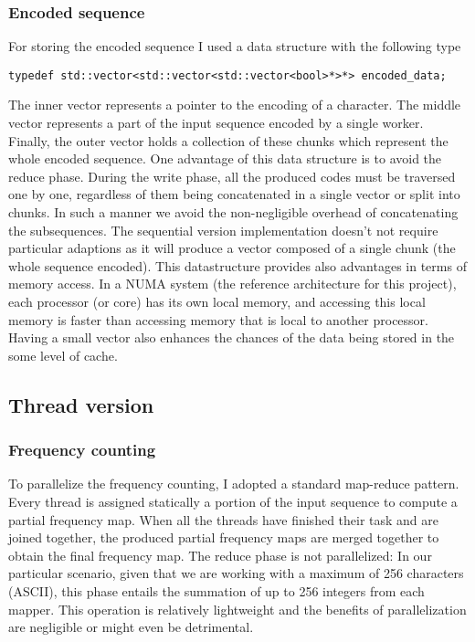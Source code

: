 \documentclass{article}
\begin{document}
\subsubsection{Encoded sequence}
For storing the encoded sequence I used a data structure with the following type

\begin{verbatim}
typedef std::vector<std::vector<std::vector<bool>*>*> encoded_data;
\end{verbatim}

The inner vector represents a
pointer to the encoding of a character. The middle vector
represents a part of the input sequence encoded by a single worker.
Finally, the outer vector holds a collection of these chunks which represent
the whole encoded sequence.
One advantage of this data structure is to avoid the reduce phase.
During the write phase, all the produced codes must be traversed one by one, regardless
of them being concatenated in a single vector or split into chunks. In such a manner we
avoid the non-negligible overhead of concatenating the subsequences.
The sequential version implementation doesn't not require particular adaptions as it
will produce a vector composed of a single chunk (the whole sequence encoded).
This datastructure provides also advantages in terms of memory access.
In a NUMA system (the reference architecture for this project), each processor (or core) has its own local memory,
and accessing this local memory is faster than accessing memory that is local to another processor.
Having a small vector also enhances the chances of the data being stored in the some level of cache.

\subsection{Thread version}
\subsubsection{Frequency counting}
To parallelize the frequency counting, I adopted a standard
map-reduce pattern. Every thread is assigned statically a portion of
the input sequence to compute a partial frequency map.
When all the threads have finished their task and are joined together,
the produced partial frequency maps are merged together to obtain the final
frequency map. The reduce phase is not parallelized:
In our particular scenario, given that we are working with a maximum of 256 characters (ASCII),
this phase entails the summation of up to 256 integers from each mapper.
This operation is relatively lightweight and the benefits of parallelization are negligible
or might even be detrimental.
\end{document}
